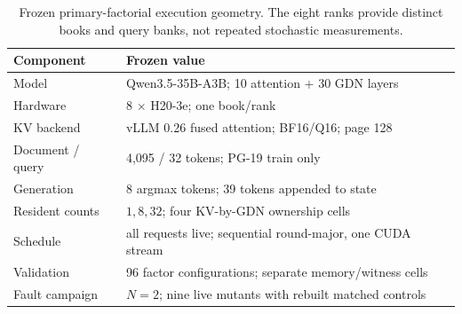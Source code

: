 \documentclass{article}
\begin{document}
\begin{table}[H]
  \caption{Frozen primary-factorial execution geometry.  The eight ranks
  provide distinct books and query banks, not repeated stochastic
  measurements.}
  \label{tab:protocol}
  \centering
  \small
  \begin{tabular}{@{}ll@{}}
    \toprule
    Component & Frozen value \\
    \midrule
    Model & Qwen3.5-35B-A3B; 10 attention + 30 GDN layers \\
    Hardware & 8 $\times$ H20-3e; one book/rank \\
    KV backend & vLLM 0.26 fused attention; BF16/Q16; page 128 \\
    Document / query & 4,095 / 32 tokens; PG-19 train only \\
    Generation & 8 argmax tokens; 39 tokens appended to state \\
    Resident counts & $1,8,32$; four KV-by-GDN ownership cells \\
    Schedule & all requests live; sequential round-major, one CUDA stream \\
    Validation & 96 factor configurations; separate memory/witness cells \\
    Fault campaign & $N=2$; nine live mutants with rebuilt matched controls \\
    \bottomrule
  \end{tabular}
\end{table}
\end{document}
